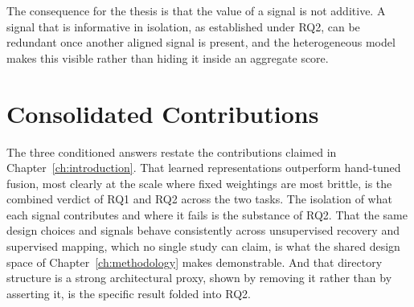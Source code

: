 The consequence for the thesis is that the value of a signal is not additive. A signal that is informative in isolation, as established under RQ2, can be redundant once another aligned signal is present, and the heterogeneous model makes this visible rather than hiding it inside an aggregate score.
 
\section{Consolidated Contributions}
\label{sec:syn-contributions}
 
The three conditioned answers restate the contributions claimed in Chapter~\ref{ch:introduction}. That learned representations outperform hand-tuned fusion, most clearly at the scale where fixed weightings are most brittle, is the combined verdict of RQ1 and RQ2 across the two tasks. The isolation of what each signal contributes and where it fails is the substance of RQ2. That the same design choices and signals behave consistently across unsupervised recovery and supervised mapping, which no single study can claim, is what the shared design space of Chapter~\ref{ch:methodology} makes demonstrable. And that directory structure is a strong architectural proxy, shown by removing it rather than by asserting it, is the specific result folded into RQ2.
